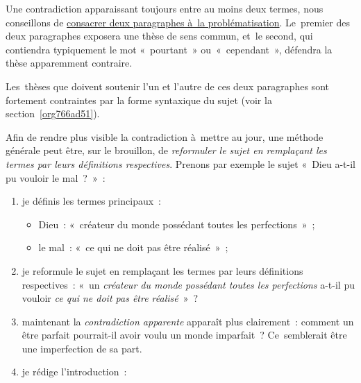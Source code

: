 \documentclass[a4paper,12pt]{report}
\begin{document}
Une contradiction apparaissant toujours entre au moins deux termes, nous
conseillons de \uline{consacrer deux paragraphes à la problématisation}.
Le premier des deux paragraphes exposera une thèse de sens commun, et le
second, qui contiendra typiquement le mot « pourtant » ou « cependant »,
défendra la thèse apparemment contraire.

Les thèses que doivent soutenir l'un et l'autre de ces deux paragraphes
sont fortement contraintes par la forme syntaxique du sujet (voir la
section \ref{org766ad51}).

Afin de rendre plus visible la contradiction à mettre au jour, une
méthode générale peut être, sur le brouillon, de \emph{reformuler le sujet en
remplaçant les termes par leurs définitions respectives}. Prenons par
exemple le sujet « Dieu a-t-il pu vouloir le mal ? » :

\begin{enumerate}
\item je définis les termes principaux :
\begin{itemize}
\item Dieu : « créateur du monde possédant toutes les perfections » ;
\item le mal : « ce qui ne doit pas être réalisé » ;
\end{itemize}

\item je reformule le sujet en remplaçant les termes par leurs définitions
respectives : « un \emph{créateur du monde possédant toutes les
perfections} a-t-il pu vouloir \emph{ce qui ne doit pas être réalisé} » ?

\item maintenant la \emph{contradiction apparente} apparaît plus clairement :
comment un être parfait pourrait-il avoir voulu un monde imparfait ?
Ce semblerait être une imperfection de sa part.

\item je rédige l'introduction :
\end{enumerate}
\end{document}
